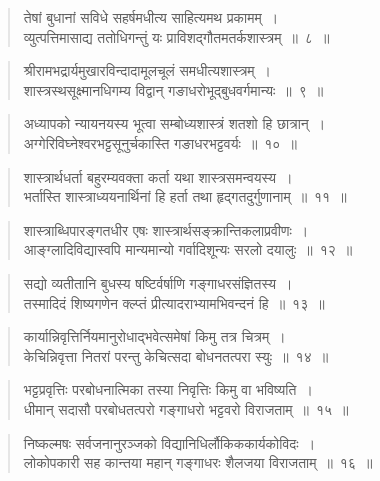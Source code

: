 {\begin{verse}
तेषां बुधानां सविधे सहर्षमधीत्य साहित्यमथ प्रकामम्~।\\
व्युत्पत्तिमासाद्य ततोधिगन्तुं यः प्राविशद्गौतमतर्कशास्त्रम्~॥~८~॥
\end{verse}

\begin{verse}
श्रीरामभद्रार्यमुखारविन्दादामूलचूलं समधीत्यशास्त्रम्~।\\
शास्त्रस्थसूक्ष्मानधिगम्य विद्वान् गङाधरोभूद्बुधवर्गमान्यः~॥~९~॥
\end{verse}

\begin{verse}
अध्यापको न्यायनयस्य भूत्वा सम्बोध्यशास्त्रं शतशो हि छात्रान्~।\\
अग्गेरिविघ्नेश्वरभट्टसूनुर्चकास्ति गङाधरभट्टवर्यः~॥~१०~॥
\end{verse}

\begin{verse}
शास्त्रार्थधर्ता बहुरम्यवक्ता कर्ता यथा शास्त्रसमन्वयस्य~।\\
भर्तास्ति शास्त्राध्ययनार्थिनां हि हर्ता तथा हृद्गतदुर्गुणानाम्~॥~११~॥
\end{verse}

\begin{verse}
शास्त्राब्धिपारङ्गतधीर एषः शास्त्रार्थसङ्क्रान्तिकलाप्रवीणः~।\\
आङ्ग्लादिविद्यास्वपि मान्यमान्यो गर्वादिशून्यः सरलो दयालुः~॥~१२~॥
\end{verse}

\begin{verse}
सद्यो व्यतीतानि बुधस्य षष्टिर्वर्षाणि गङ्गाधरसंज्ञितस्य~।\\
तस्मादिदं शिष्यगणेन क्ल्प्तं प्रीत्यादराभ्यामभिवन्दनं हि~॥~१३~॥
\end{verse}

\begin{verse}
कार्यान्निवृत्तिर्नियमानुरोधाद्भवेत्समेषां किमु तत्र चित्रम्~।\\
केचिन्निवृत्ता नितरां परन्तु केचित्सदा बोधनतत्परा स्युः~॥~१४~॥
\end{verse}

\begin{verse}
भट्टप्रवृत्तिः परबोधनात्मिका तस्या निवृत्तिः किमु वा भविष्यति~।\\
धीमान् सदासौ परबोधतत्परो गङ्गाधरो भट्टवरो विराजताम्~॥~१५~॥
\end{verse}

\begin{verse}
निष्कल्मषः सर्वजनानुरञ्जको विद्यानिधिर्लौकिककार्यकोविदः~।\\
लोकोपकारी सह कान्तया महान् गङ्गाधरः शैलजया विराजताम्~॥~१६~॥
\end{verse}

}
